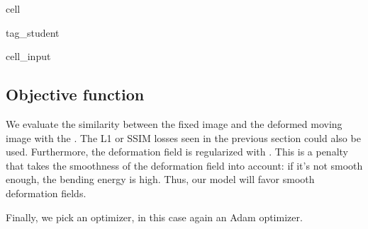 \documentclass[letterpaper,10pt,english]{jupyterBook}
\begin{document}
\begin{sphinxuseclass}{cell}
\begin{sphinxuseclass}{tag_student}\begin{sphinxVerbatimInput}

\begin{sphinxuseclass}{cell_input}
\begin{sphinxVerbatim}[commandchars=\\\{\}]
  

  
\end{sphinxVerbatim}

\end{sphinxuseclass}\end{sphinxVerbatimInput}

\end{sphinxuseclass}
\end{sphinxuseclass}

\subsection{Objective function}
\label{\detokenize{notebooks/Tutorial6_Registration/Tutorial6_Registration_student:objective-function}}
\sphinxAtStartPar
We evaluate the similarity between the fixed image and the deformed moving image with the . The L1 or SSIM losses seen in the previous section could also be used. Furthermore, the deformation field is regularized with . This is a penalty that takes the smoothness of the deformation field into account: if it’s not smooth enough, the bending energy is high. Thus, our model will favor smooth deformation fields.

\sphinxAtStartPar
Finally, we pick an optimizer, in this case again an Adam optimizer.
\end{document}
